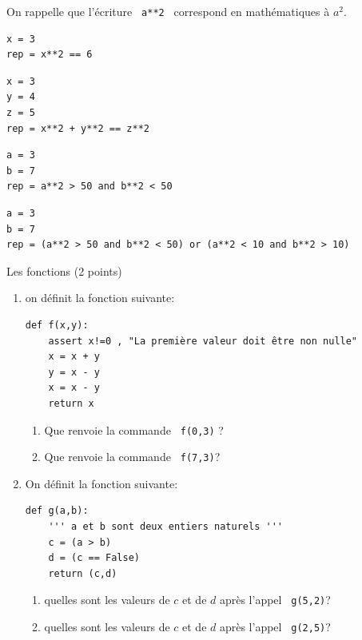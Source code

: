 \documentclass[a4paper,12pt,openany]{book}
\begin{document}
	On rappelle que l'écriture \verb+ a**2 + correspond en mathématiques à $a^2$.

	\begin{lstlisting}
x = 3
rep = x**2 == 6
\end{lstlisting}

\bigskip

	\begin{lstlisting}
x = 3
y = 4
z = 5
rep = x**2 + y**2 == z**2
\end{lstlisting}

\bigskip

	\begin{lstlisting}
a = 3
b = 7
rep = a**2 > 50 and b**2 < 50
\end{lstlisting}

\bigskip

	\begin{lstlisting}
a = 3
b = 7
rep = (a**2 > 50 and b**2 < 50) or (a**2 < 10 and b**2 > 10)

\end{lstlisting}

\newpage


\exo \qquad Les fonctions \hfill
(2 points)

\begin{enumerate}
	\item on définit la fonction suivante:
	
\begin{lstlisting}
def f(x,y):
	assert x!=0 , "La première valeur doit être non nulle"
	x = x + y
	y = x - y
	x = x - y
	return x

\end{lstlisting}

	\begin{enumerate}
		\item Que renvoie la commande \verb+ f(0,3)+ ? \dotfill
		\item Que renvoie la commande \verb+ f(7,3)+? \dotfill
	\end{enumerate}

\medskip

\item On définit la fonction suivante:

\begin{lstlisting}
def g(a,b):
	''' a et b sont deux entiers naturels '''
	c = (a > b)
	d = (c == False)
	return (c,d)

\end{lstlisting}

\begin{enumerate}
	\item quelles sont les valeurs de $c$ et de $d$ après l'appel \verb+ g(5,2)+?\dotfill
	\item quelles sont les valeurs de $c$ et de $d$ après l'appel \verb+ g(2,5)+?\dotfill
\end{enumerate}
\end{enumerate}
\end{document}
